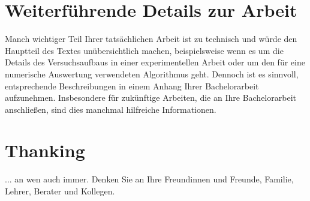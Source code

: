 \documentclass[a4paper,11pt,oneside,final,english,toc=bib,draft]{scrbook}
\begin{document}



\chapter{Weiterführende Details zur Arbeit} %
\label{cha:weiterführende_details_zur_arbeit}

Manch wichtiger Teil Ihrer tatsächlichen Arbeit ist zu technisch 
und würde den Hauptteil des Textes unübersichtlich machen, 
beispielsweise wenn es um die Details des Versuchsaufbaus in einer 
experimentellen Arbeit oder um den für eine numerische Auswertung 
verwendeten Algorithmus geht. Dennoch ist es sinnvoll, entsprechende 
Beschreibungen in einem Anhang Ihrer Bachelorarbeit aufzunehmen. 
Insbesondere für zukünftige Arbeiten, die an Ihre Bachelorarbeit 
anschließen, sind dies manchmal hilfreiche Informationen.


\chapter{Thanking} %
\label{cha:thanking}

... an wen auch immer. Denken Sie an Ihre Freundinnen und Freunde, 
Familie, Lehrer, Berater und Kollegen.



\end{document}
